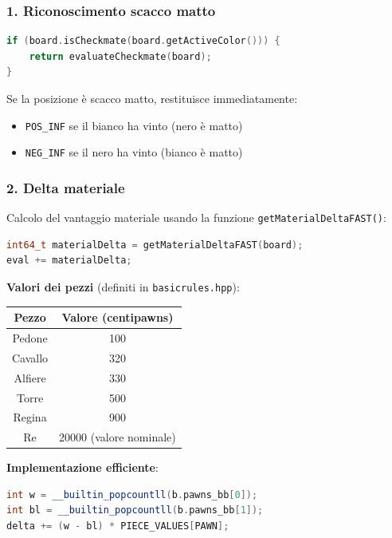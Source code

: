 \subsubsection{1. Riconoscimento scacco matto}

\begin{lstlisting}[language=C++]
if (board.isCheckmate(board.getActiveColor())) {
    return evaluateCheckmate(board);
}
\end{lstlisting}

Se la posizione è scacco matto, restituisce immediatamente:
\begin{itemize}
\item \texttt{POS\_INF} se il bianco ha vinto (nero è matto)
\item \texttt{NEG\_INF} se il nero ha vinto (bianco è matto)
\end{itemize}

\subsubsection{2. Delta materiale}

Calcolo del vantaggio materiale usando la funzione \texttt{getMaterialDeltaFAST()}:

\begin{lstlisting}[language=C++]
int64_t materialDelta = getMaterialDeltaFAST(board);
eval += materialDelta;
\end{lstlisting}

\textbf{Valori dei pezzi} (definiti in \texttt{basicrules.hpp}):
\begin{center}
\begin{tabular}{|c|c|}
\hline
\textbf{Pezzo} & \textbf{Valore (centipawns)} \\
\hline
Pedone   & 100 \\
Cavallo  & 320 \\
Alfiere  & 330 \\
Torre    & 500 \\
Regina   & 900 \\
Re       & 20000 (valore nominale) \\
\hline
\end{tabular}
\end{center}

\textbf{Implementazione efficiente}:
\begin{lstlisting}[language=C++]
int w = __builtin_popcountll(b.pawns_bb[0]);
int bl = __builtin_popcountll(b.pawns_bb[1]);
delta += (w - bl) * PIECE_VALUES[PAWN];
\end{lstlisting}

